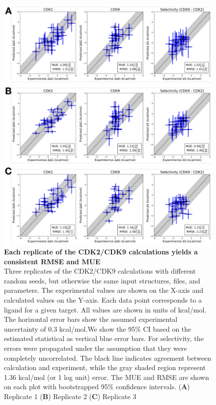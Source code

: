 \documentclass[phd,tocprelim]{cornell}
\begin{document}
\begin{appendices}
	\begin{landscape}
		\begin{figure}[p]
			\centering
			\includegraphics[width=0.46\linewidth]{figures/supp_figure4.pdf}
			\caption[Each replicate of the CDK2/CDK9 calculations yields a consistent RMSE and MUE]{
				{\bf Each replicate of the CDK2/CDK9 calculations yields a consistent RMSE and MUE} \\
				Three replicates of the CDK2/CDK9 calculations with different random seeds, but otherwise the same input structures, files, and parameters. The experimental values are shown on the X-axis and calculated values on the Y-axis. Each data point corresponds to a ligand for a given target. All values are shown in units of kcal/mol. The horizontal error bars show the assumed experimental uncertainty of 0.3 kcal/mol\citep{BROWN2009420}.We show the 95\% CI based on the estimated statistical as vertical blue error bars. For selectivity, the errors were propagated under the assumption that they were completely uncorrelated. The black line indicates agreement between calculation and experiment, while the gray shaded region represent 1.36 kcal/mol (or 1 log unit) error. The MUE and RMSE are shown on each plot with bootstrapped 95$\%$ confidence intervals. ({\bf A}) Replicate 1 ({\bf B}) Replicate 2 ({\bf C}) Replicate 3}
			\label{fig:sup-figure-4}
		\end{figure}
	\end{landscape}
	

\end{appendices}
\end{document}
